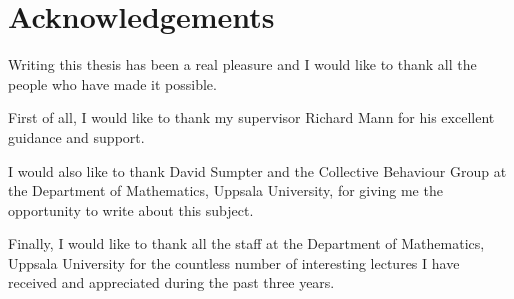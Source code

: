 \section*{Acknowledgements}
Writing this thesis has been a real pleasure and I would like to thank all the people who have made it possible. 

First of all, I would like to thank my supervisor Richard Mann for his excellent guidance and support. 

I would also like to thank David Sumpter and the Collective Behaviour Group at the Department of Mathematics, Uppsala University, for giving me the opportunity to write about this subject.

Finally, I would like to thank all the staff at the Department of Mathematics, Uppsala University for the countless number of interesting lectures I have received and appreciated during the past three years.
